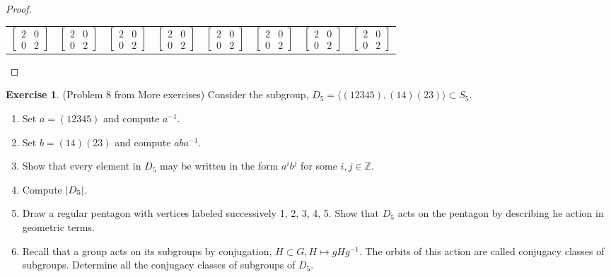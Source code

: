 \documentclass[12pt, psamsfonts]{amsart}
\theoremstyle{definition}
\newtheorem*{exer}{Exercise}
\theoremstyle{remark}
\numberwithin{equation}{section}
\begin{document}
\begin{proof}
\begin{enumerate}
\begin{center}
\begin{tabular}{|c|c|c|c|c|c|c|c|}
          $\begin{bmatrix} 2 & 0 \\ 0 & 2 \end{bmatrix}$
          & $\begin{bmatrix} 2 & 0 \\ 0 & 2 \end{bmatrix}$
          & $\begin{bmatrix} 2 & 0 \\ 0 & 2 \end{bmatrix}$
          & $\begin{bmatrix} 2 & 0 \\ 0 & 2 \end{bmatrix}$
          & $\begin{bmatrix} 2 & 0 \\ 0 & 2 \end{bmatrix}$
          & $\begin{bmatrix} 2 & 0 \\ 0 & 2 \end{bmatrix}$
          & $\begin{bmatrix} 2 & 0 \\ 0 & 2 \end{bmatrix}$
          & $\begin{bmatrix} 2 & 0 \\ 0 & 2 \end{bmatrix}$ \\
        \end{tabular}
      \end{center}
  \end{enumerate}
\end{proof}

\begin{exer}{(Problem 8 from More exercises)}
  Consider the subgroup, $D_5 = \langle (12345), (14)(23) \rangle \subset S_5$.
  \begin{enumerate}
    \item
      Set $a = (12345)$ and compute $a^{-1}$.
    \item
      Set $b = (14)(23)$ and compute $aba^{-1}$.
    \item
      Show that every element in $D_5$ may be written in the form $a^ib^j$ for some $i, j \in \mathbb{Z}$.
    \item
      Compute $\abs{D_5}$.
    \item
      Draw a regular pentagon with vertices labeled successively 1, 2, 3, 4, 5.
      Show that $D_5$ acts on the pentagon by describing he action in geometric terms.
    \item
      Recall that a group acts on its subgroups by conjugation, $H \subset G, H \mapsto gHg^{-1}$.
      The orbits of this action are called conjugacy classes of subgroups.
      Determine all the conjugacy classes of subgroups of $D_5$.
  \end{enumerate}
\end{exer}
\end{document}
